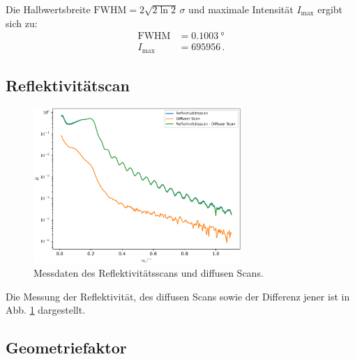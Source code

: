 Die Halbwertsbreite $\mathrm{FWHM} = 2\sqrt{2\ln 2}\,\sigma$  und 
maximale Intensität $I_\text{max}$ ergibt sich zu:
\begin{align*}
  \mathrm{FWHM}  &= \SI{0.1003}{\degree} \\
  I_\text{max} &= \num{695956} \, .
\end{align*}



\subsection{Reflektivitätscan}

\begin{figure}
  \centering
  \includegraphics[width=0.7\textwidth]{figures/plot_messung1_diff.pdf}
  \caption{Messdaten des Reflektivitätsscans und diffusen Scans.}
  \label{fig:plot_messung1_diff}
\end{figure}

Die Messung der Reflektivität, des diffusen Scans sowie der Differenz
jener ist in Abb. \ref{fig:plot_messung1_diff} dargestellt.

\subsection{Geometriefaktor}

